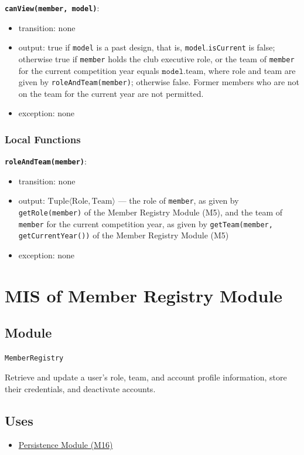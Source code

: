 \documentclass[12pt, titlepage]{article}
\begin{document}
\textbf{\texttt{canView(member, model)}}:
\begin{itemize}
  \item transition: none
  \item output: true if \texttt{model} is a past design, that is, \texttt{model}.\texttt{isCurrent} is false; otherwise true if \texttt{member} holds the club executive role, or the team of \texttt{member} for the current competition year equals $\texttt{model}.\text{team}$, where role and team are given by \texttt{roleAndTeam(member)}; otherwise false. Former members who are not on the team for the current year are not permitted.
  \item exception: none
\end{itemize}

\subsubsection{Local Functions}

\textbf{\texttt{roleAndTeam(member)}}:
\begin{itemize}
  \item transition: none
  \item output: $\text{Tuple}\langle \text{Role}, \text{Team} \rangle$ --- the role of \texttt{member}, as given by \texttt{getRole(member)} of the Member Registry Module (M5), and the team of \texttt{member} for the current competition year, as given by \texttt{getTeam(member, getCurrentYear())} of the Member Registry Module (M5)
  \item exception: none
\end{itemize}

\newpage

\section{MIS of Member Registry Module} \label{mMembers}

\subsection{Module}
\texttt{MemberRegistry}

Retrieve and update a user's role, team, and account profile information, store their credentials, and deactivate accounts.

\subsection{Uses}
\begin{itemize}
  \item \hyperref[mPersist]{Persistence Module (M16)}
\end{itemize}
\end{document}
